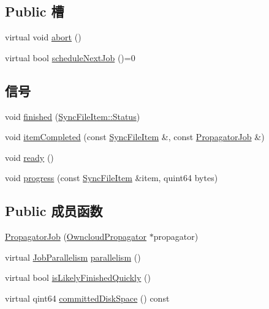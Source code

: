 \subsection*{Public 槽}
\begin{DoxyCompactItemize}
\item 
virtual void \hyperlink{class_o_c_c_1_1_propagator_job_a0d33573c817a705179a87db936b8dcb4}{abort} ()
\item 
virtual bool \hyperlink{class_o_c_c_1_1_propagator_job_a344574482155de72f164883b56f4ebf3}{schedule\+Next\+Job} ()=0
\end{DoxyCompactItemize}
\subsection*{信号}
\begin{DoxyCompactItemize}
\item 
void \hyperlink{class_o_c_c_1_1_propagator_job_a79edbc2126a62878e64c85289b6b847f}{finished} (\hyperlink{class_o_c_c_1_1_sync_file_item_a149ade86eddd9661587bfbc9bcbca408}{Sync\+File\+Item\+::\+Status})
\item 
void \hyperlink{class_o_c_c_1_1_propagator_job_aee4dac27675315a4b0116c0056e2f564}{item\+Completed} (const \hyperlink{class_o_c_c_1_1_sync_file_item}{Sync\+File\+Item} \&, const \hyperlink{class_o_c_c_1_1_propagator_job}{Propagator\+Job} \&)
\item 
void \hyperlink{class_o_c_c_1_1_propagator_job_a8e3be5aab321b6bfa4a82253f33ac1c6}{ready} ()
\item 
void \hyperlink{class_o_c_c_1_1_propagator_job_a35dd6d6cd14b4ddbf0b2528508a07804}{progress} (const \hyperlink{class_o_c_c_1_1_sync_file_item}{Sync\+File\+Item} \&item, quint64 bytes)
\end{DoxyCompactItemize}
\subsection*{Public 成员函数}
\begin{DoxyCompactItemize}
\item 
\hyperlink{class_o_c_c_1_1_propagator_job_a360692a84fc7736eb1b9d68d2d265bf7}{Propagator\+Job} (\hyperlink{class_o_c_c_1_1_owncloud_propagator}{Owncloud\+Propagator} $\ast$propagator)
\item 
virtual \hyperlink{class_o_c_c_1_1_propagator_job_a2527eb0e2b598fc260a2d6449689c156}{Job\+Parallelism} \hyperlink{class_o_c_c_1_1_propagator_job_a55105e001d55177f8ccf01acecc5e637}{parallelism} ()
\item 
virtual bool \hyperlink{class_o_c_c_1_1_propagator_job_a1272ff804d4daf4798f08af6f654944d}{is\+Likely\+Finished\+Quickly} ()
\item 
virtual qint64 \hyperlink{class_o_c_c_1_1_propagator_job_a7bc39b8adaf93fd29668b768e1e7b20d}{committed\+Disk\+Space} () const
\end{DoxyCompactItemize}
